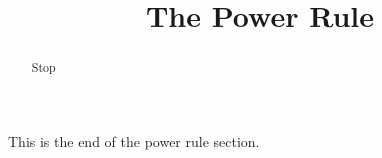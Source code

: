 \documentclass[handout]{ximera}
\title{The Power Rule}
\begin{document}
\begin{abstract} Stop
\end{abstract}

\maketitle

This is the end of the power rule section.
\end{document}
